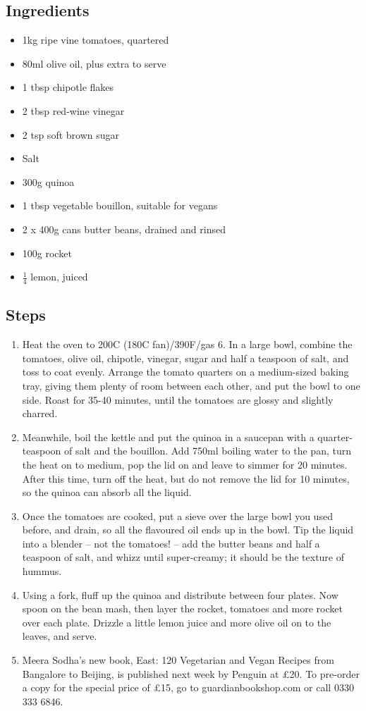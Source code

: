\documentclass{book}
\begin{document}
\subsection*{Ingredients}
\begin{itemize}
\item 1kg ripe vine tomatoes, quartered
\item 80ml olive oil, plus extra to serve
\item 1 tbsp chipotle flakes
\item 2 tbsp red-wine vinegar
\item 2 tsp soft brown sugar
\item Salt
\item 300g quinoa
\item 1 tbsp vegetable bouillon, suitable for vegans
\item 2 x 400g cans butter beans, drained and rinsed
\item 100g rocket
\item $\frac{1}{4}$ lemon, juiced
\end{itemize}

\subsection*{Steps}
\begin{enumerate}
\item Heat the oven to 200C (180C fan)/390F/gas 6. In a large bowl, combine the tomatoes, olive oil, chipotle, vinegar, sugar and half a teaspoon of salt, and toss to coat evenly. Arrange the tomato quarters on a medium-sized baking tray, giving them plenty of room between each other, and put the bowl to one side. Roast for 35-40 minutes, until the tomatoes are glossy and slightly charred.
\item Meanwhile, boil the kettle and put the quinoa in a saucepan with a quarter-teaspoon of salt and the bouillon. Add 750ml boiling water to the pan, turn the heat on to medium, pop the lid on and leave to simmer for 20 minutes. After this time, turn off the heat, but do not remove the lid for 10 minutes, so the quinoa can absorb all the liquid.
\item Once the tomatoes are cooked, put a sieve over the large bowl you used before, and drain, so all the flavoured oil ends up in the bowl. Tip the liquid into a blender – not the tomatoes! – add the butter beans and half a teaspoon of salt, and whizz until super-creamy; it should be the texture of hummus.
\item Using a fork, fluff up the quinoa and distribute between four plates. Now spoon on the bean mash, then layer the rocket, tomatoes and more rocket over each plate. Drizzle a little lemon juice and more olive oil on to the leaves, and serve.
\item Meera Sodha’s new book, East: 120 Vegetarian and Vegan Recipes from Bangalore to Beijing, is published next week by Penguin at £20. To pre-order a copy for the special price of £15, go to guardianbookshop.com or call 0330 333 6846.
\end{enumerate}
\newpage
\end{document}
